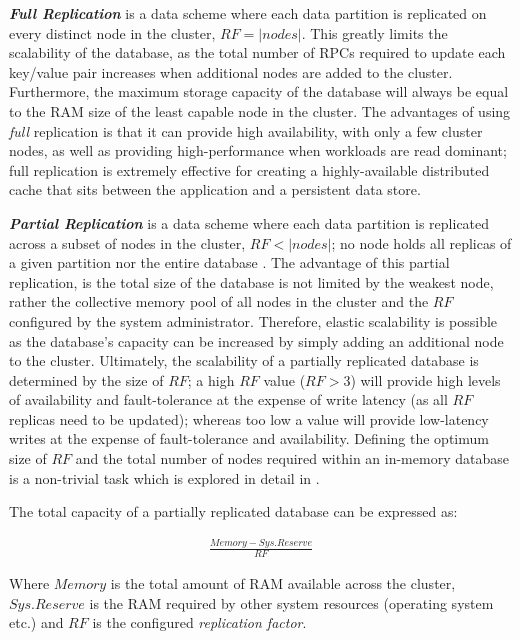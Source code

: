 	\textbf{\emph{Full Replication}} is a data scheme where each data partition is replicated on every distinct node in the cluster, $RF = \left\vert nodes \right\vert$.  This greatly limits the scalability of the database, as the total number of RPCs required to update each key/value pair increases when additional nodes are added to the cluster.  Furthermore, the maximum storage capacity of the database will always be equal to the RAM size of the least capable node in the cluster.  The advantages of using \emph{full} replication is that it can provide high availability, with only a few cluster nodes, as well as providing high-performance when workloads are read dominant; full replication is extremely effective for creating a highly-available distributed cache that sits between the application and a persistent data store.  
	
	\textbf{\emph{Partial Replication}} is a data scheme where each data partition is replicated across a subset of nodes in the cluster, $RF < \left\vert nodes \right\vert$; no node holds all replicas of a given partition nor the entire database \citep{Schiper:2010:PGP:1915085.1916444}.  The advantage of this partial replication, is the total size of the database is not limited by the weakest node, rather the collective memory pool of all nodes in the cluster and the $RF$ configured by the system administrator.  Therefore, elastic scalability is possible as the database's capacity can be increased by simply adding an additional node to the cluster.  Ultimately, the scalability of a partially replicated database is determined by the size of $RF$; a high $RF$ value ($RF > 3$) will provide high levels of availability and fault-tolerance at the expense of write latency (as all $RF$ replicas need to be updated); whereas too low a value will provide low-latency writes at the expense of fault-tolerance and availability.   Defining the optimum size of $RF$ and the total number of nodes required within an in-memory database is a non-trivial task which is explored in detail in \citep{DiSanzo:2013:FHP:2512734.2512743}.  
	
	The total capacity of a partially replicated database can be expressed as:
	
	\begin{equation*}
		     \begin{aligned}
		       \frac{Memory - Sys.Reserve}{RF}
		     \end{aligned}
	\end{equation*}	
	
	 Where $Memory$ is the total amount of RAM available across the cluster, $Sys.Reserve$ is the RAM required by other system resources (operating system etc.) and $RF$ is the configured \emph{replication factor}.  


